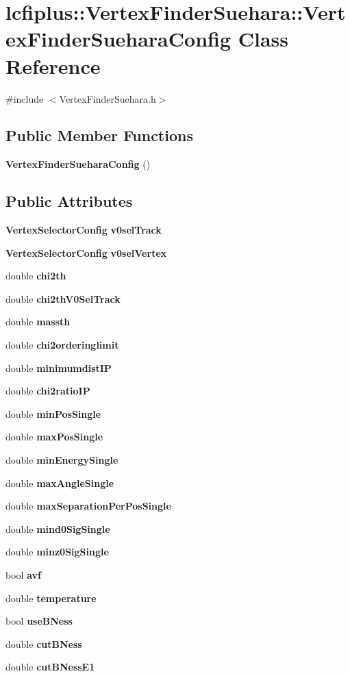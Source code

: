 \section{lcfiplus\+:\+:Vertex\+Finder\+Suehara\+:\+:Vertex\+Finder\+Suehara\+Config Class Reference}
\label{classlcfiplus_1_1VertexFinderSuehara_1_1VertexFinderSueharaConfig}


{\ttfamily \#include $<$Vertex\+Finder\+Suehara.\+h$>$}

\subsection*{Public Member Functions}
\begin{DoxyCompactItemize}
\item 
\textbf{ Vertex\+Finder\+Suehara\+Config} ()
\end{DoxyCompactItemize}
\subsection*{Public Attributes}
\begin{DoxyCompactItemize}
\item 
\textbf{ Vertex\+Selector\+Config} \textbf{ v0sel\+Track}
\item 
\textbf{ Vertex\+Selector\+Config} \textbf{ v0sel\+Vertex}
\item 
double \textbf{ chi2th}
\item 
double \textbf{ chi2th\+V0\+Sel\+Track}
\item 
double \textbf{ massth}
\item 
double \textbf{ chi2orderinglimit}
\item 
double \textbf{ minimumdist\+IP}
\item 
double \textbf{ chi2ratio\+IP}
\item 
double \textbf{ min\+Pos\+Single}
\item 
double \textbf{ max\+Pos\+Single}
\item 
double \textbf{ min\+Energy\+Single}
\item 
double \textbf{ max\+Angle\+Single}
\item 
double \textbf{ max\+Separation\+Per\+Pos\+Single}
\item 
double \textbf{ mind0\+Sig\+Single}
\item 
double \textbf{ minz0\+Sig\+Single}
\item 
bool \textbf{ avf}
\item 
double \textbf{ temperature}
\item 
bool \textbf{ use\+B\+Ness}
\item 
double \textbf{ cut\+B\+Ness}
\item 
double \textbf{ cut\+B\+Ness\+E1}
\end{DoxyCompactItemize}


